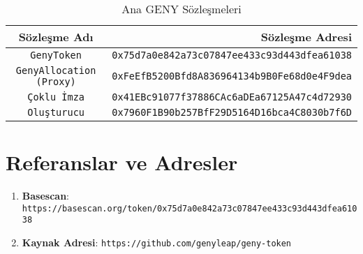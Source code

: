 \documentclass[a4paper,12pt,openany]{book}
\begin{document}
\begin{table}[h]
\centering
\caption*{Ana GENY Sözleşmeleri}
\small
\begin{tabular}{c r}
\hline
\textbf{Sözleşme Adı} & \textbf{Sözleşme Adresi} \\
\hline
\texttt{GenyToken} & {\texttt{0x75d7a0e842a73c07847ee433c93d443dfea61038}} \\
\texttt{GenyAllocation (Proxy)} & {\texttt{0xFeEfB5200Bfd8A836964134b9B0Fe68d0e4F9dea}} \\
\texttt{Çoklu İmza} & {\texttt{0x41EBc91077f37886CAc6aDEa67125A47c4d72930}} \\
\texttt{Oluşturucu} & {\texttt{0x7960F1B90b257BfF29D5164D16bca4C8030b7f6D}} \\
\hline
\end{tabular}
\end{table}

\section*{Referanslar ve Adresler}

\begin{enumerate}
    \item \textbf{Basescan}: \texttt{https://basescan.org/token/0x75d7a0e842a73c07847ee433c93d443dfea61038}
    \item \textbf{Kaynak Adresi}: \texttt{https://github.com/genyleap/geny-token}
\end{enumerate}
\end{document}
